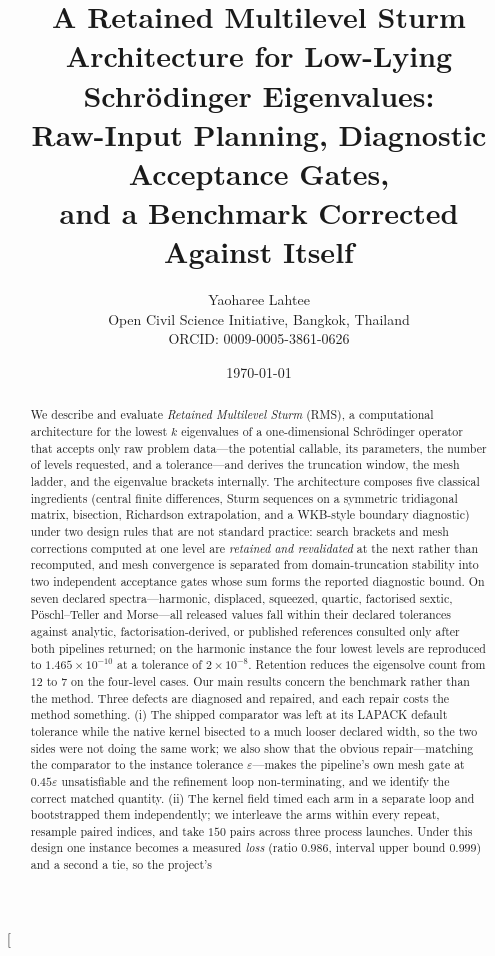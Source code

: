 \documentclass[twocolumn,10pt,a4paper]{article}
\title{\bfseries A Retained Multilevel Sturm Architecture for Low-Lying
Schr\"odinger Eigenvalues:\\[2pt]
Raw-Input Planning, Diagnostic Acceptance Gates,\\ and a Benchmark Corrected Against Itself}
\author{%
Yaoharee Lahtee\\[2pt]
\normalsize Open Civil Science Initiative, Bangkok, Thailand\\
\normalsize ORCID: 0009-0005-3861-0626
}
\date{\today}
\theoremstyle{plain}
\theoremstyle{definition}
\newcommand{\eps}{\varepsilon}
\begin{document}
\twocolumn[
\begin{@twocolumnfalse}
\maketitle
\begin{abstract}
\noindent
We describe and evaluate \emph{Retained Multilevel Sturm} (RMS), a computational
architecture for the lowest $k$ eigenvalues of a one-dimensional Schr\"odinger
operator that accepts only raw problem data---the potential callable, its
parameters, the number of levels requested, and a tolerance---and derives the
truncation window, the mesh ladder, and the eigenvalue brackets internally. The
architecture composes five classical ingredients (central finite differences,
Sturm sequences on a symmetric tridiagonal matrix, bisection, Richardson
extrapolation, and a WKB-style boundary diagnostic) under two design rules that
are not standard practice: search brackets and mesh corrections computed at one
level are \emph{retained and revalidated} at the next rather than recomputed,
and mesh convergence is separated from domain-truncation stability into two
independent acceptance gates whose sum forms the reported diagnostic bound.
On seven declared spectra---harmonic, displaced, squeezed, quartic, factorised
sextic, P\"oschl--Teller and Morse---all released values fall within their
declared tolerances against analytic, factorisation-derived, or published
references consulted only after both pipelines returned; on the harmonic
instance the four lowest levels are reproduced to $1.465\times10^{-10}$ at a
tolerance of $2\times10^{-8}$. Retention reduces the eigensolve count from $12$
to $7$ on the four-level cases.
Our main results concern the benchmark rather than the method. Three defects
are diagnosed and repaired, and each repair costs the method something. (i) The
shipped comparator was left at its LAPACK default tolerance while the native
kernel bisected to a much looser declared width, so the two sides were not doing
the same work; we also show that the obvious repair---matching the comparator to
the instance tolerance $\eps$---makes the pipeline's own mesh gate at $0.45\eps$
unsatisfiable and the refinement loop non-terminating, and we identify the
correct matched quantity. (ii) The kernel field timed each arm in a separate
loop and bootstrapped them independently; we interleave the arms within every
repeat, resample paired indices, and take $150$ pairs across three process
launches. Under this design one instance becomes a measured \emph{loss}
(ratio $0.986$, interval upper bound $0.999$) and a second a tie, so the project's

\end{abstract}
\end{@twocolumnfalse}
\end{document}
